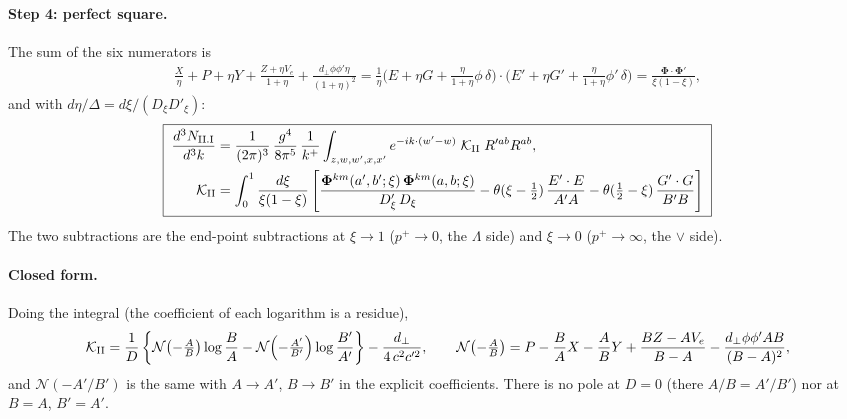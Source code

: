 \documentclass[10pt]{article}
\numberwithin{equation}{section}
\begin{document}
\paragraph{Step 4: perfect square.} The sum of the six numerators is
\begin{align}
\frac X\eta+P+\eta Y+\frac{Z+\eta V_{e}}{1+\eta}+\frac{d_{\perp}\phi\phi'\eta}{(1+\eta)^{2}}
=\frac{1}{\eta}\Big(E+\eta G+\tfrac{\eta}{1+\eta}\phi\,\delta\Big)\cdot\Big(E'+\eta G'+\tfrac{\eta}{1+\eta}\phi'\,\delta\Big)=\frac{\mathbf{\Phi}\cdot\mathbf{\Phi}'}{\xi(1-\xi)},
\end{align}
and with $d\eta/\Delta=d\xi/(D_{\xi}D'_{\xi})$:
\begin{align}
\boxed{\;\begin{aligned}
\frac{d^{3}N_{\rm II.I}}{d^{3}k}&=\frac{1}{(2\pi)^{3}}\,\frac{g^{4}}{8\pi^{5}}\,\frac{1}{k^{+}}\int_{z,w,w',x,x'}e^{-ik\cdot(w'-w)}\;\mathcal{K}_{\rm II}\;R'^{ab}R^{ab},\\
\mathcal{K}_{\rm II}&=\int_{0}^{1}\frac{d\xi}{\xi(1-\xi)}\left[\frac{\mathbf{\Phi}^{km}(a',b';\xi)\,\mathbf{\Phi}^{km}(a,b;\xi)}{D'_{\xi}\,D_{\xi}}-\theta(\xi-\tfrac12)\,\frac{E'\cdot E}{A'A}-\theta(\tfrac12-\xi)\,\frac{G'\cdot G}{B'B}\right]
\end{aligned}\;} \label{eq:GII}
\end{align}
The two subtractions are the end-point subtractions at $\xi\to1$ ($p^{+}\to0$, the $\Lambda$ side) and $\xi\to0$ ($p^{+}\to\infty$, the $\vee$ side).

\paragraph{Closed form.} Doing the integral (the coefficient of each logarithm is a residue),
\begin{align}
\mathcal{K}_{\rm II}=\frac{1}{D}\left\{\mathcal{N}\!\left(-\tfrac{A}{B}\right)\log\frac{B}{A}-\mathcal{N}\!\left(-\tfrac{A'}{B'}\right)\log\frac{B'}{A'}\right\}-\frac{d_{\perp}}{4\,c^{2}c'^{2}},\qquad
\mathcal{N}\!\left(-\tfrac{A}{B}\right)=P-\frac BAX-\frac ABY+\frac{BZ-AV_{e}}{B-A}-\frac{d_{\perp}\phi\phi'AB}{(B-A)^{2}}, \label{eq:KIIclosed}
\end{align}
and $\mathcal{N}(-A'/B')$ is the same with $A\to A'$, $B\to B'$ in the explicit coefficients. There is no pole at $D=0$ (there $A/B=A'/B'$) nor at $B=A$, $B'=A'$.
\end{document}
